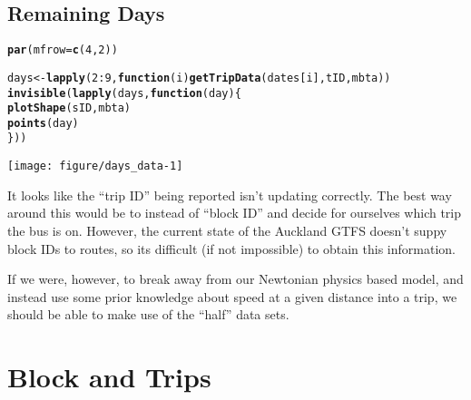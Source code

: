 \documentclass[11pt]{article}\usepackage[]{graphicx}\usepackage[]{color}
\makeatletter
\newcommand{\hlnum}[1]{\textcolor[rgb]{0.686,0.059,0.569}{#1}}%
\newcommand{\hlopt}[1]{\textcolor[rgb]{0,0,0}{#1}}%
\newcommand{\hlstd}[1]{\textcolor[rgb]{0.345,0.345,0.345}{#1}}%
\newcommand{\hlkwa}[1]{\textcolor[rgb]{0.161,0.373,0.58}{\textbf{#1}}}%
\newcommand{\hlkwb}[1]{\textcolor[rgb]{0.69,0.353,0.396}{#1}}%
\newcommand{\hlkwc}[1]{\textcolor[rgb]{0.333,0.667,0.333}{#1}}%
\newcommand{\hlkwd}[1]{\textcolor[rgb]{0.737,0.353,0.396}{\textbf{#1}}}%
\newenvironment{kframe}{%
 \def\at@end@of@kframe{}%
 \ifinner\ifhmode%
  \def\at@end@of@kframe{\end{minipage}}%
  \begin{minipage}{\columnwidth}%
 \fi\fi%
 \def\FrameCommand##1{\hskip\@totalleftmargin \hskip-\fboxsep
 \colorbox{shadecolor}{##1}\hskip-\fboxsep
     \hskip-\linewidth \hskip-\@totalleftmargin \hskip\columnwidth}%
 \MakeFramed {\advance\hsize-\width
   \@totalleftmargin\z@ \linewidth\hsize
   \@setminipage}}%
 {\par\unskip\endMakeFramed%
 \at@end@of@kframe}
\newenvironment{knitrout}{}{} %
\makeatother
\begin{document}
\subsection{Remaining Days}


\begin{knitrout}
\color{fgcolor}\begin{kframe}
\begin{alltt}
\hlkwd{par}\hlstd{(}\hlkwc{mfrow} \hlstd{=} \hlkwd{c}\hlstd{(}\hlnum{4}\hlstd{,} \hlnum{2}\hlstd{))}

\hlstd{days} \hlkwb{<-} \hlkwd{lapply}\hlstd{(}\hlnum{2} \hlopt{:}\hlnum{9}\hlstd{,} \hlkwa{function}\hlstd{(}\hlkwc{i}\hlstd{)} \hlkwd{getTripData}\hlstd{(dates[i], tID, mbta))}
\hlkwd{invisible}\hlstd{(}\hlkwd{lapply}\hlstd{(days,} \hlkwa{function}\hlstd{(}\hlkwc{day}\hlstd{) \{}
    \hlkwd{plotShape}\hlstd{(sID, mbta)}
    \hlkwd{points}\hlstd{(day)}
\hlstd{\}))}
\end{alltt}
\end{kframe}

{\centering \texttt{[image: figure/days\_data-1]} 

}



\end{knitrout}

It looks like the ``trip ID'' being reported isn't updating correctly.
The best way around this would be to instead of ``block ID'' and decide for ourselves which trip the
bus is on.
However, the current state of the Auckland GTFS doesn't suppy block IDs to routes, so its difficult
(if not impossible) to obtain this information. 

If we were, however, to break away from our Newtonian physics based model, and instead use some
prior knowledge about speed at a given distance into a trip, we should be able to make use of the
``half'' data sets.



\section{Block and Trips}
\end{document}
